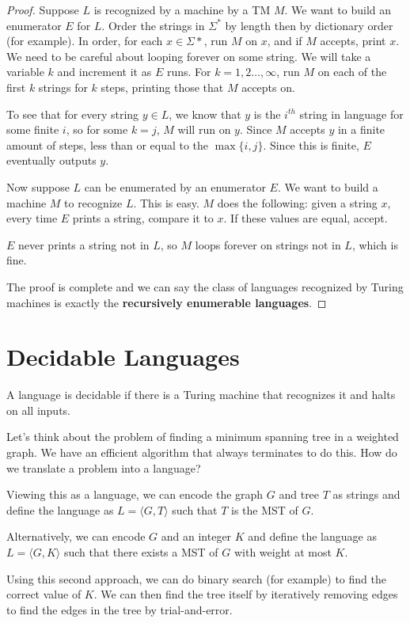 \begin{proof}
	
	Suppose $L$ is recognized by a machine by a TM $M$.  We want to build an enumerator $E$ for $L$.  Order the strings in $\Sigma^*$ by length then by dictionary order (for example).  In order, for each $x\in\Sigma*$, run $M$ on $x$, and if $M$ accepts, print $x$.  We need to be careful about looping forever on some string.  We will take a variable $k$ and increment it as $E$ runs.  For $k=1,2\dots,\infty$, run $M$ on each of the first $k$ strings for $k$ steps, printing those that $M$ accepts on.
	
	To see that for every string $y\in L$, we know that $y$ is the $i^{th}$ string in language for some finite $i$, so for some $k = j$, $M$ will run on $y$.  Since $M$ accepts $y$ in a finite amount of steps, less than or equal to the $\max\{i,j\}$.  Since this is finite, $E$ eventually outputs $y$.
	
	Now suppose $L$ can be enumerated by an enumerator $E$.  We want to build a machine $M$ to recognize $L$.  This is easy.  $M$ does the following: given a string $x$, every time $E$ prints a string, compare it to $x$.  If these values are equal, accept.  
	
	$E$ never prints a string not in $L$, so $M$ loops forever on strings not in $L$, which is fine.
	
	The proof is complete and we can say the class of languages recognized by Turing machines is exactly the \textbf{recursively enumerable languages}.
	
	
\end{proof}


\section*{Decidable Languages}

A language is decidable if there is a Turing machine that recognizes it and halts on all inputs.

Let's think about the problem of finding a minimum spanning tree in a weighted graph.  We have an efficient algorithm that always terminates to do this.  How do we translate a problem into a language?

Viewing this as a language, we can encode the graph $G$ and tree $T$ as strings and define the language as $L=\langle G,T\rangle$ such that $T$ is the MST of $G$.  

Alternatively, we can encode $G$ and an integer $K$ and define the language as $L = \langle G,K\rangle$ such that there exists a MST of $G$ with weight at most $K$.

Using this second approach, we can do binary search (for example) to find the correct value of $K$.  We can then find the tree itself by iteratively removing edges to find the edges in the tree by trial-and-error.














